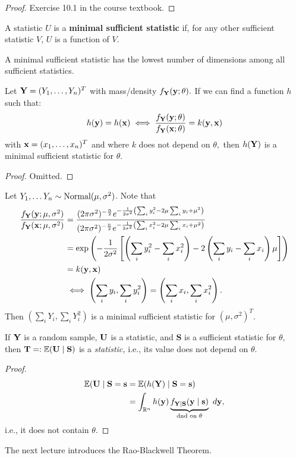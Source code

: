 \begin{proof}
Exercise 10.1 in the course textbook.
\end{proof}

\begin{definition}
A statistic $U$ is a \textbf{minimal sufficient statistic} if, for any other sufficient statistic $V$, $U$ is a function of $V.$
\end{definition}
A minimal sufficient statistic has the lowest number of dimensions among all sufficient statistics.

\begin{prop}
Let $\mathbf Y=(Y_1,\ldots, Y_n)^T$ with mass/density $f_\mathbf Y(\mathbf y;\theta).$ If we can find a function $h$ such that:
$$
h(\mathbf y)=h(\mathbf x) \;\Longleftrightarrow\; \frac{f_\mathbf Y(\mathbf y;\theta)}{f_\mathbf Y(\mathbf x;\theta)} = k(\mathbf y,\mathbf x)
$$
with $\mathbf x=(x_1,\ldots,x_n)^T$ and where $k$ does not depend on $\theta,$ then $h(\mathbf Y)$ is a minimal sufficient statistic for $\theta.$
\end{prop}

\begin{proof}
Omitted.
\end{proof}

\begin{eg}
Let $Y_1,\ldots Y_n\sim \operatorname*{Normal}(\mu,\sigma^2)$. Note that
\begin{align*}
    \frac{f_\mathbf Y(\mathbf y;\mu,\sigma^2)}{f_\mathbf Y(\mathbf x;\mu,\sigma^2)} &= \frac{(2\pi\sigma^2)^{-\frac{n}{2}}e^{-\frac{1}{2\sigma^2}\left(\sum_i y_i^2-2\mu\sum_i y_i +\mu^2\right)}}{(2\pi\sigma^2)^{-\frac{n}{2}}e^{-\frac{1}{2\sigma^2}\left(\sum_i x_i^2-2\mu\sum_ix_i +\mu^2\right)}}\\
    &=\exp\left(-\frac{1}{2\sigma^2}\left[\left(\sum_i y_i^2-\sum_ix_i^2\right)-2\left(\sum_i y_i - \sum_i x_i\right)\mu\right]\right) \\
    &= k(\mathbf y,\mathbf x) \\
    &\;\Longleftrightarrow\; \left(\sum_iy_i,\sum_i y_i^2\right)=\left(\sum_i x_i,\sum_ix_i^2\right).
\end{align*}
Then $\left(\sum_iY_i,\sum_iY_i^2\right)$ is a minimal sufficient statistic for $(\mu,\sigma^2)^T$. 
\end{eg}

\begin{prop}
If $\mathbf Y$ is a random sample, $\mathbf U$ is a statistic, and $\mathbf S$ is a sufficient statistic for $\theta,$ then $\mathbf T=:\mathbb E(\mathbf U \mid \mathbf S)$ is a \textit{statistic,} i.e., its value does not depend on $\theta.$
\end{prop}
\begin{proof}
\begin{align*}
    \mathbb E(\mathbf U\mid \mathbf S=\mathbf s &= \mathbb E(h(\mathbf Y) \mid \mathbf S = \mathbf s) \\
    &= \int_{\mathbb R^n}h(\mathbf y)\underbrace{f_{\mathbf Y\mid \mathbf S}(\mathbf y\mid \mathbf s)}_{\text{dnd on $\theta$}} \ d\mathbf y,
\end{align*}
i.e., it does not contain $\theta.$
\end{proof}

The next lecture introduces the Rao-Blackwell Theorem.
